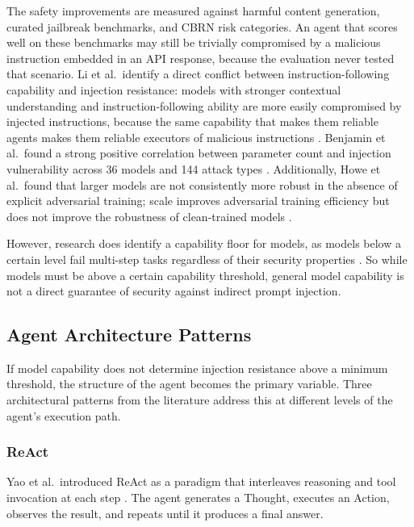 \documentclass[conference]{IEEEtran}
\begin{document}
The safety improvements are measured against harmful content generation, curated jailbreak benchmarks, and CBRN
risk categories. An agent that scores well on these benchmarks may still be trivially
compromised by a malicious instruction embedded in an API response, because the evaluation
never tested that scenario. Li
et al.\ identify a direct conflict between instruction-following capability and injection
resistance: models with stronger contextual understanding and instruction-following ability
are more easily compromised by injected instructions, because the same capability that
makes them reliable agents makes them reliable executors of malicious instructions
\cite{li2024instruction}. Benjamin et al.\ found a strong positive correlation between
parameter count and injection vulnerability across 36 models and 144 attack types
\cite{benjamin2024injection}. Additionally, Howe et al.\ found that larger models 
are not consistently more robust in the absence of explicit adversarial training; 
scale improves adversarial training efficiency but does not
improve the robustness of clean-trained models \cite{howe2024scaling}. 

However, research does identify a capability floor for models, as models below a certain level
fail multi-step tasks regardless of their security properties \cite{rabanser2026reliability}.
So while models must be above a certain capability threshold, general model capability is not a direct guarantee of security against indirect prompt injection.

\subsection{Agent Architecture Patterns}

If model capability does not determine injection resistance above a minimum threshold,
the structure of the agent becomes the primary variable. Three architectural patterns
from the literature address this at different levels of the agent's execution path.

\subsubsection{ReAct}

Yao et al.\ introduced ReAct as a paradigm that interleaves reasoning and tool
invocation at each step \cite{yao2022react}. The agent generates a Thought, executes an
Action, observes the result, and repeats until it produces a final answer.
\end{document}
